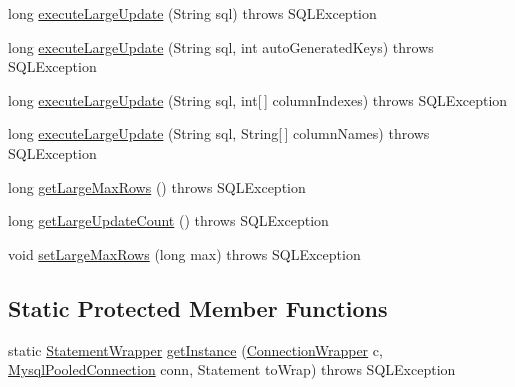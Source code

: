 \begin{DoxyCompactItemize}
\item 
long \mbox{\hyperlink{classcom_1_1mysql_1_1cj_1_1jdbc_1_1_statement_wrapper_abb4c8e14cb82eeb39515f31705912030}{execute\+Large\+Update}} (String sql)  throws S\+Q\+L\+Exception 
\item 
long \mbox{\hyperlink{classcom_1_1mysql_1_1cj_1_1jdbc_1_1_statement_wrapper_a65bd051d4128bab4bcbaa58793a64350}{execute\+Large\+Update}} (String sql, int auto\+Generated\+Keys)  throws S\+Q\+L\+Exception 
\item 
long \mbox{\hyperlink{classcom_1_1mysql_1_1cj_1_1jdbc_1_1_statement_wrapper_a30669664b8085abf39605e17a93a2267}{execute\+Large\+Update}} (String sql, int\mbox{[}$\,$\mbox{]} column\+Indexes)  throws S\+Q\+L\+Exception 
\item 
long \mbox{\hyperlink{classcom_1_1mysql_1_1cj_1_1jdbc_1_1_statement_wrapper_a907a6487714ad7ebfa9748941e8536ba}{execute\+Large\+Update}} (String sql, String\mbox{[}$\,$\mbox{]} column\+Names)  throws S\+Q\+L\+Exception 
\item 
long \mbox{\hyperlink{classcom_1_1mysql_1_1cj_1_1jdbc_1_1_statement_wrapper_a278f7751716609f44cbe208f8da4bd4a}{get\+Large\+Max\+Rows}} ()  throws S\+Q\+L\+Exception 
\item 
long \mbox{\hyperlink{classcom_1_1mysql_1_1cj_1_1jdbc_1_1_statement_wrapper_a2d0e35e66a5244ef9218c70d17296a2a}{get\+Large\+Update\+Count}} ()  throws S\+Q\+L\+Exception 
\item 
void \mbox{\hyperlink{classcom_1_1mysql_1_1cj_1_1jdbc_1_1_statement_wrapper_ab2e820896ea1e4ae65f5151dfca8af5f}{set\+Large\+Max\+Rows}} (long max)  throws S\+Q\+L\+Exception 
\end{DoxyCompactItemize}
\subsection*{Static Protected Member Functions}
\begin{DoxyCompactItemize}
\item 
static \mbox{\hyperlink{classcom_1_1mysql_1_1cj_1_1jdbc_1_1_statement_wrapper}{Statement\+Wrapper}} \mbox{\hyperlink{classcom_1_1mysql_1_1cj_1_1jdbc_1_1_statement_wrapper_a27bd31a020b0037551230fd0c451fe4a}{get\+Instance}} (\mbox{\hyperlink{classcom_1_1mysql_1_1cj_1_1jdbc_1_1_connection_wrapper}{Connection\+Wrapper}} c, \mbox{\hyperlink{classcom_1_1mysql_1_1cj_1_1jdbc_1_1_mysql_pooled_connection}{Mysql\+Pooled\+Connection}} conn, Statement to\+Wrap)  throws S\+Q\+L\+Exception 
\end{DoxyCompactItemize}
